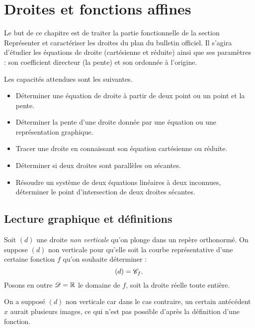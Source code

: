 
\chapter{Droites et fonctions affines}

Le but de ce chapitre est de traiter la partie fonctionnelle de la section \og Représenter et caractériser les droites du plan \fg du bulletin officiel.
Il s'agira d'étudier les équations de droite (cartésienne et réduite) ainsi que ses paramètres : son coefficient directeur (la pente) et son ordonnée à l'origine.

Les capacités attendues sont les suivantes.
	\begin{itemize}
		\item Déterminer une équation de droite à partir de deux point ou un point et la pente.
		\item Déterminer la pente d'une droite donnée par une équation ou une représentation graphique.
		\item Tracer une droite en connaissant son équation cartésienne ou réduite.
		\item Déterminer si deux droites sont parallèles ou sécantes.
		\item Résoudre un système de deux équations linéaires à deux inconnues, déterminer le point d'intersection de deux droites sécantes.
	\end{itemize}

\section{Lecture graphique et définitions}\label{sec:aff-1}

Soit $(d)$ une droite \emph{non verticale} qu'on plonge dans un repère orthonormé.
On suppose $(d)$ non verticale pour qu'elle soit la courbe représentative d'une certaine fonction $f$ qu'on souhaite déterminer : \[(d) = \mathcal{C}_f. \]
Posons en outre $\mathcal{D} = \mathbb{R}$ le domaine de $f$, soit la droite réelle toute entière.

On a supposé $(d)$ non verticale car dans le cas contraire, un certain antécédent $x$ aurait plusieurs images, ce qui n'est pas possible d'après la définition d'une fonction.


